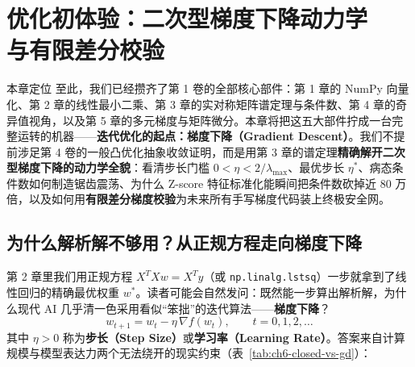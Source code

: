 \chapter[二次型梯度下降与有限差分校验]{优化初体验：二次型梯度下降动力学\\与有限差分校验}
\label{ch:gd-dynamics-gradcheck}


\begin{chapIntro}{本章定位}
至此，我们已经攒齐了第 1 卷的全部核心部件：第 1 章的 NumPy 向量化、第 2 章的线性最小二乘、第 3 章的实对称矩阵谱定理与条件数、第 4 章的奇异值视角，以及第 5 章的多元梯度与矩阵微分。本章将把这五大部件拧成一台完整运转的机器——\textbf{迭代优化的起点：梯度下降（Gradient Descent）}。我们不提前涉足第 4 卷的一般凸优化抽象收敛证明，而是用第 3 章的谱定理\textbf{精确解开二次型梯度下降的动力学全貌}：看清步长门槛 $0 < \eta < 2/\lambda_{\max}$、最优步长 $\eta^*$、病态条件数如何制造锯齿震荡、为什么 Z-score 特征标准化能瞬间把条件数砍掉近 80 万倍，以及如何用\textbf{有限差分梯度校验}为未来所有手写梯度代码装上终极安全网。
\end{chapIntro}

\section{为什么解析解不够用？从正规方程走向梯度下降}
\label{sec:ch6-why-gd}

第 2 章里我们用正规方程 $X^T X w = X^T y$（或 \texttt{np.linalg.lstsq}）一步就拿到了线性回归的精确最优权重 $w^*$。读者可能会自然发问：既然能一步算出解析解，为什么现代 AI 几乎清一色采用看似“笨拙”的迭代算法——\textbf{梯度下降}？
\begin{equation}\label{eq:ch6-gd-update}
  w_{t+1} = w_t - \eta\, \nabla f(w_t), \qquad t = 0, 1, 2, \dots
\end{equation}
其中 $\eta > 0$ 称为\textbf{步长（Step Size）}或\textbf{学习率（Learning Rate）}。答案来自计算规模与模型表达力两个无法绕开的现实约束（表~\ref{tab:ch6-closed-vs-gd}）：

